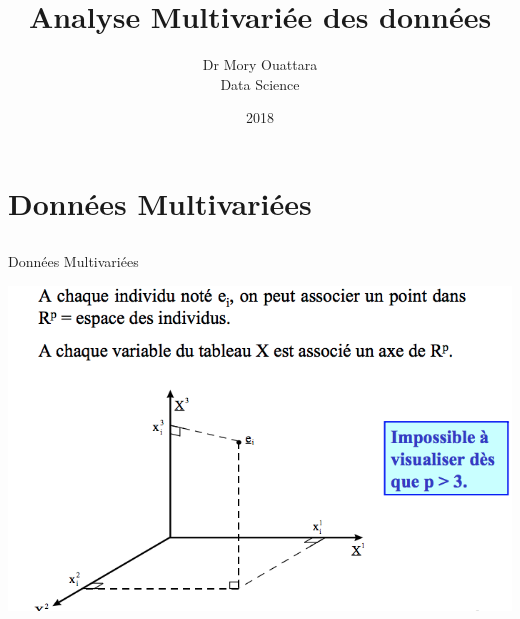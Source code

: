 \documentclass[10pt]{beamer}
\author{Dr Mory Ouattara\\  Data Science }
\title{Analyse Multivariée des données}
\institute{INPHB}
\date{2018}
\begin{document}
\begin{frame}
\titlepage
\end{frame}

\begin{frame}
\tableofcontents
\end{frame}

\section{Données Multivariées}

\subsection{ }





\begin{frame}{Données Multivariées}

  
\centering 
 \includegraphics[scale=0.45]{Proj1.png} 
 

\end{frame}
\end{document}
